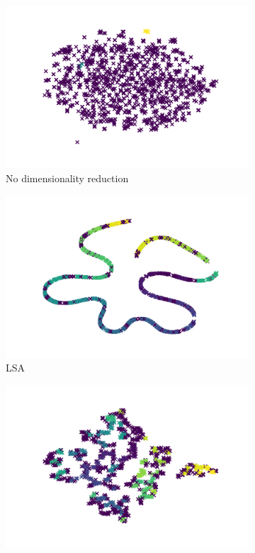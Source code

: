 \begin{figure}
  \centering
  \begin{subfigure}{.3\textwidth}
      \centering
      \includegraphics[width=\linewidth]{imgs/optics.png}
      \caption{No dimensionality reduction}
      \label{fig:optics_no_dim}
  \end{subfigure}
  \begin{subfigure}{.3\textwidth}
    \centering
    \includegraphics[width=\linewidth]{imgs/optics_lsa.png}
    \caption{LSA}
    \label{fig:optics_lsa}
  \end{subfigure}%
  \begin{subfigure}{.3\textwidth}
    \centering
    \includegraphics[width=\linewidth]{imgs/optics_spectral.png}

\end{subfigure}
\end{figure}
